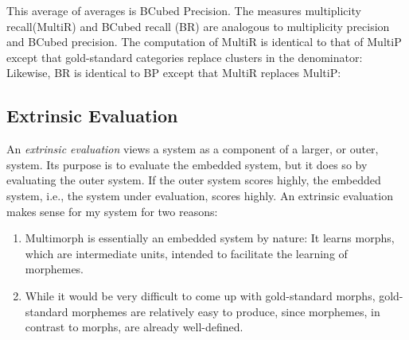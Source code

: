 This average of averages is BCubed Precision. 
The measures multiplicity recall(MultiR) and BCubed recall (BR) are analogous to multiplicity precision and
 BCubed precision. The computation of MultiR is identical to that of MultiP 
 except that gold-standard categories replace clusters in the denominator: 
Likewise, BR is identical to BP except that MultiR replaces MultiP: 

\subsection{Extrinsic Evaluation} \label{sec:eval-extrinsic} An \emph{extrinsic evaluation} 
views a system as a component of a larger, or outer, system. 
Its purpose is to evaluate the embedded system, but it does so by evaluating the outer 
system. If the outer system scores highly,
the embedded system, i.e., the system under evaluation, scores highly.
An extrinsic evaluation makes sense for my system for two reasons:
\begin{enumerate}
\item Multimorph is essentially an embedded system by nature: It learns morphs, which are intermediate units, intended to facilitate the learning of morphemes. %
\item While it would be very difficult to come up with gold-standard morphs, gold-standard morphemes are relatively easy to produce, since morphemes, in contrast to morphs, are already well-defined. 
\end{enumerate}

